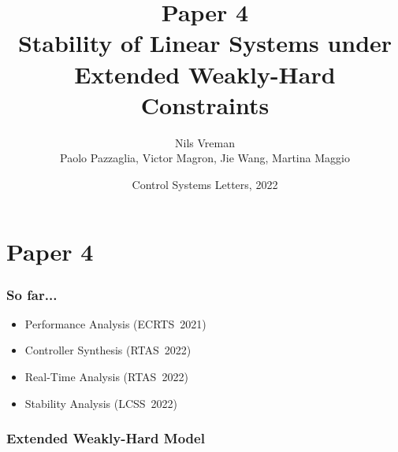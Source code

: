 \section{Paper 4}

\title[PhD Defence]{
    {\Huge Paper 4} \\
    \vspace{2mm}
    {\Large Stability of Linear Systems under\\Extended Weakly-Hard Constraints} \\
}
\author[Nils Vreman]{
    Nils Vreman \\
    \vspace{3mm}
    {\large Paolo Pazzaglia, Victor Magron, Jie Wang, Martina Maggio}
}
\date[LCSS 2022]{
    Control Systems Letters, 2022\\
}
\notitlelogo
{}

\begin{frame}
    \frametitle{So far...}
    \begin{itemize}
        \item Performance Analysis (ECRTS~2021)
        \item Controller Synthesis (RTAS~2022)
        \item Real-Time Analysis (RTAS~2022)
        \item<2> \textcolor{lqgcolour}{Stability Analysis (LCSS~2022)}
    \end{itemize}
\end{frame}

\begin{frame}
    \frametitle{Extended Weakly-Hard Model}
    \begin{figure}[h]
        \centering
    \end{figure}
\end{frame}

